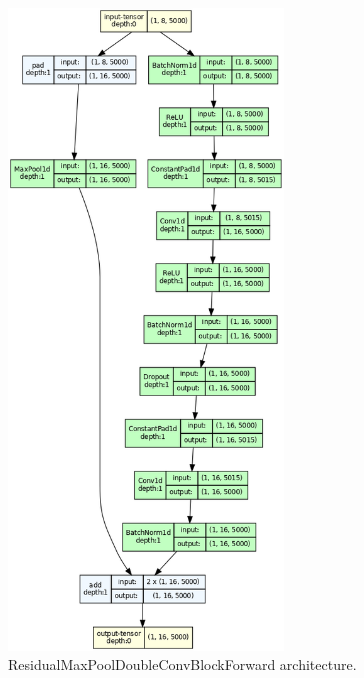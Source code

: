\documentclass[a4paper,10pt]{article}
\begin{document}
\begin{figure}[p]
	\centering
	\includegraphics[width=0.65\textwidth]{ResidualMaxPoolDoubleConvBlockForward.gv.png}
	\caption{ResidualMaxPoolDoubleConvBlockForward architecture.}
	\label{fig:resfw_architecture}
\end{figure}
\end{document}
